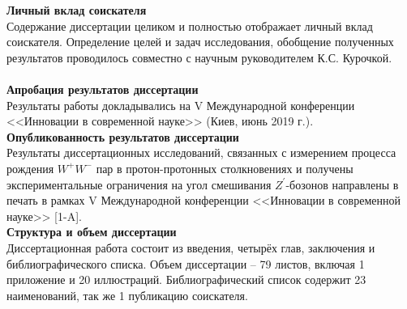 \textbf{Личный вклад соискателя}\\

Содержание диссертации целиком и полностью отображает личный вклад соискателя. Определение целей и задач исследования, обобщение полученных результатов проводилось совместно с научным руководителем К.С. Курочкой.\\

\\

\textbf{Апробация результатов диссертации}\\

Результаты работы докладывались на V Международной конференции <<Инновации в современной науке>> (Киев, июнь 2019 г.).
\\

\textbf{Опубликованность результатов диссертации}\\

Результаты диссертационных исследований, связанных с измерением процесса рождения ${W}^{+}{W}^{-}$ пар в протон-протонных столкновениях и получены экспериментальные ограничения на угол смешивания ${Z}^{\prime}$-бозонов направлены в печать в рамках V Международной конференции <<Инновации в современной науке>> [1-A].
\\

\textbf{Структура и объем диссертации}\\

Диссертационная работа состоит из введения, четырёх глав, заключения и библиографического списка. Объем диссертации – 79 листов, включая 1 приложение и 20 иллюстраций. Библиографический список содержит 23 наименований, так же 1 публикацию соискателя.
